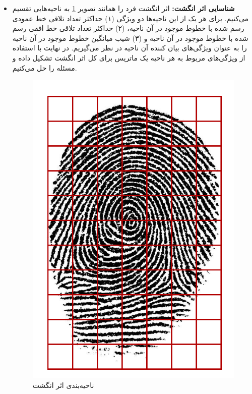 \documentclass[14pt,a4]{article}
\begin{document}
\begin{itemize}
    \item \textbf{شناسایی اثر انگشت:} اثر انگشت فرد را همانند تصویر \ref{fingerprint}
    به ناحیه‌هایی تقسیم می‌کنیم. برای هر یک از این ناحیه‌ها دو ویژگی (۱) حداکثر تعداد تلاقی خط عمودی رسم شده
    با خطوط موجود در آن ناحیه، (۲) حداکثر تعداد تلاقی خط افقی رسم شده با خطوط موجود در آن ناحیه و
    (۳) شیب میانگین خطوط موجود در آن ناحیه را به عنوان ویژگی‌های بیان کننده آن ناحیه در نظر می‌گیریم.
    در نهایت با استفاده از ویژگی‌های مربوط به هر ناحیه یک ماتریس برای کل اثر انگشت
    تشکیل داده و مسئله را حل می‌کنیم.

    \begin{figure}[h]
        \centering
        \includegraphics[scale=0.4]{images/q2/fingerprint.png}
        \caption{ناحیه‌بندی اثر انگشت}
        \label{fingerprint}
    \end{figure}


\end{itemize}
\end{document}
